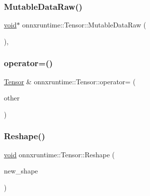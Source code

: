 \mbox{\label{classonnxruntime_1_1Tensor_a64e52a47859e86aef3fa540f26ebee22}} 
\subsubsection{\texorpdfstring{Mutable\+Data\+Raw()}{MutableDataRaw()}\hspace{0.1cm}{\footnotesize\ttfamily [2/2]}}
{\footnotesize\ttfamily \mbox{\hyperlink{mlasi_8h_a88f941d423cb2a819b70a1358982b1a6}{void}}$\ast$ onnxruntime\+::\+Tensor\+::\+Mutable\+Data\+Raw (\begin{DoxyParamCaption}{ }\end{DoxyParamCaption})\hspace{0.3cm}{\ttfamily [inline]}, {\ttfamily [noexcept]}}

\mbox{\label{classonnxruntime_1_1Tensor_a2492423abd572294c6b1df2faaa2fd7b}} 
\subsubsection{\texorpdfstring{operator=()}{operator=()}}
{\footnotesize\ttfamily \mbox{\hyperlink{classonnxruntime_1_1Tensor}{Tensor}} \& onnxruntime\+::\+Tensor\+::operator= (\begin{DoxyParamCaption}\item[{\mbox{\hyperlink{classonnxruntime_1_1Tensor}{Tensor}} \&\&}]{other }\end{DoxyParamCaption})}

\mbox{\label{classonnxruntime_1_1Tensor_a4088f3950586c511377f1904b2e44a3f}} 
\subsubsection{\texorpdfstring{Reshape()}{Reshape()}}
{\footnotesize\ttfamily \mbox{\hyperlink{mlasi_8h_a88f941d423cb2a819b70a1358982b1a6}{void}} onnxruntime\+::\+Tensor\+::\+Reshape (\begin{DoxyParamCaption}\item[{const \mbox{\hyperlink{classonnxruntime_1_1TensorShape}{Tensor\+Shape}} \&}]{new\+\_\+shape }\end{DoxyParamCaption})\hspace{0.3cm}{\ttfamily [inline]}}

